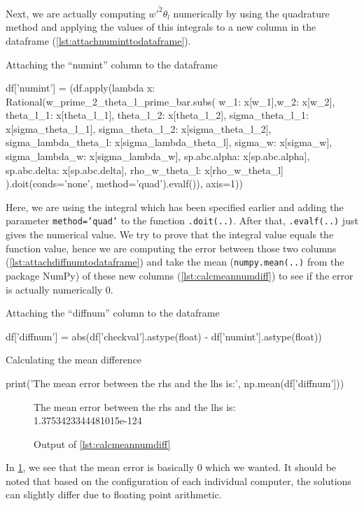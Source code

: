 Next, we are actually computing $\overline{w'^2\theta_l}$ numerically by using the quadrature method 
and applying the values of this integrals 
to a new column in the dataframe (\cref{lst:attachnuminttodataframe}).
\begin{listing}[!ht]
    \caption{Attaching the \enquote{numint} column to the dataframe}
    \label{lst:attachnuminttodataframe}
    \begin{pythoncode}
        df['numint'] = (df.apply(lambda x: Rational(w_prime_2_theta_l_prime_bar.subs({
            w_1: x[w_1],w_2: x[w_2], theta_l_1: x[theta_l_1], theta_l_2: x[theta_l_2],
            sigma_theta_l_1: x[sigma_theta_l_1], sigma_theta_l_2: x[sigma_theta_l_2],
            sigma_lambda_theta_l: x[sigma_lambda_theta_l], sigma_w: x[sigma_w],
            sigma_lambda_w: x[sigma_lambda_w], sp.abc.alpha: x[sp.abc.alpha],
            sp.abc.delta: x[sp.abc.delta], rho_w_theta_l: x[rho_w_theta_l]
        }).doit(conds='none', method='quad').evalf()), axis=1))
    \end{pythoncode}
\end{listing}
Here, we are using the integral which has been specified earlier 
and adding the parameter \texttt{method='quad'} 
to the function \texttt{.doit(..)}.
After that, \texttt{.evalf(..)} just gives the numerical value.
We try to prove that the integral value equals the function value, 
hence we are computing the error between those two columns (\cref{lst:attachdiffnumtodataframe})
and take the mean (\texttt{numpy.mean(..)} from the package NumPy\autocite{harris2020array})
of these new columns (\cref{lst:calcmeannumdiff}) to see if the error is actually numerically 0.
\begin{listing}[!ht]
    \caption{Attaching the \enquote{diffnum} column to the dataframe}
    \label{lst:attachdiffnumtodataframe}
    \begin{pythoncode}
        df['diffnum'] = abs(df['checkval'].astype(float) - df['numint'].astype(float))
    \end{pythoncode}
\end{listing}
\begin{listing}[!ht]
    \caption{Calculating the mean difference}
    \label{lst:calcmeannumdiff}
    \begin{pythoncode}
        print('The mean error between the rhs and the lhs is:', np.mean(df['diffnum']))
    \end{pythoncode}
\end{listing}
\begin{figure}[!ht]
    \centering
    \caption{Output of \cref{lst:calcmeannumdiff}}
    \label{fig:calcmeannumdiffout}
    The mean error between the rhs and the lhs is: 1.3753423344481015e-124
\end{figure}

In \cref{fig:calcmeannumdiffout}, we see that the mean error is basically 0 which we wanted.
It should be noted that based on the configuration of each individual computer,
the solutions can slightly differ due to floating point arithmetic.
